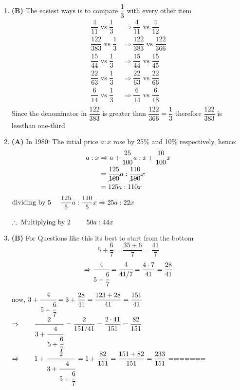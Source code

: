 \begin{multicols}{2}
\begin{enumerate}[label={\textbf{\arabic*.}}]
\begin{enumerate}[label={\arabic*.}]
    \item \textbf{(B) }The easiest ways is to compare $\dfrac{1}{3}$ with every other item \\
        \begin{align*}
            \dfrac{4}{11} \text{ vs } \dfrac{1}{3} &\Rightarrow \dfrac{4}{11} \text{ vs } \dfrac{4}{12} \\
            \dfrac{122}{383} \text{ vs } \dfrac{1}{3} &\Rightarrow \dfrac{122}{383} \text{ vs } \dfrac{122}{366} \\
            \dfrac{15}{44} \text{ vs } \dfrac{1}{3} &\Rightarrow \dfrac{15}{44} \text{ vs } \dfrac{15}{45} \\
            \dfrac{22}{63} \text{ vs } \dfrac{1}{3} &\Rightarrow \dfrac{22}{63} \text{ vs } \dfrac{22}{66} \\
            \dfrac{6}{14} \text{ vs } \dfrac{1}{3} &\Rightarrow \dfrac{6}{14} \text{ vs } \dfrac{6}{18} \\
        \end{align*}
        Since the denominator in $\dfrac{122}{383}$ is greater than $\dfrac{122}{366} = \dfrac{1}{3}$ therefore $\dfrac{122}{383}$ is lessthan one-third

    \item \textbf{(A)} In 1980: The intial price \(a : x\) rose by 25\% and 10\% respectively, hence: 
        \begin{align*}
        a:x &\Rightarrow  a + \dfrac{25}{100}a : x + \dfrac{10}{100}x  \\
        & = \dfrac{125}{\cancel{100}}a : \dfrac{110}{\cancel{100}}x \\ 
        &= {125}a : 110x \\
    \end{align*}
    \(\text{dividing by 5 } \hspace{10px} \dfrac{125}{5} a : \dfrac{110}{5} x  \Rightarrow 25a : 22x\) \\\\
    \(\therefore \text{ Multiplying by 2 } \hspace{20px}  50a : 44x \)

    \item \textbf{(B)} For Questions like this its best to start from the bottom \\
    \[5 + \dfrac{6}{7} = \dfrac{35 + 6}{7} = \dfrac{41}{7} \] 
     \[\Rightarrow \cfrac{4}{5 + \cfrac{6}{7}} = \cfrac{4}{41/7} = \dfrac{4 \cdot 7}{41} = \dfrac{28}{41}\]
    now, \(3 + \cfrac{4}{5 + \cfrac{6}{7}} = 3 + \dfrac{28}{41} = \dfrac{123 + 28}{41} = \dfrac{151}{41} \)  \vspace{10pt} \\
    \(\Rightarrow \hspace{20px} \dfrac{2}{3 + \cfrac{4}{5 + \cfrac{6}{7}}} = \dfrac{2}{151/41} = \dfrac{2 \cdot 41}{151} = \dfrac{82}{151} \) \vspace{10pt} \\
    \(\Rightarrow \hspace{20px} 1 + \dfrac{2}{3 + \cfrac{4}{5 + \cfrac{6}{7}}} = 1 + \dfrac{82}{151} = \dfrac{151 + 82}{151} = \dfrac{233}{151} \)
=======
    

\end{enumerate}
\end{enumerate}
\end{multicols}
